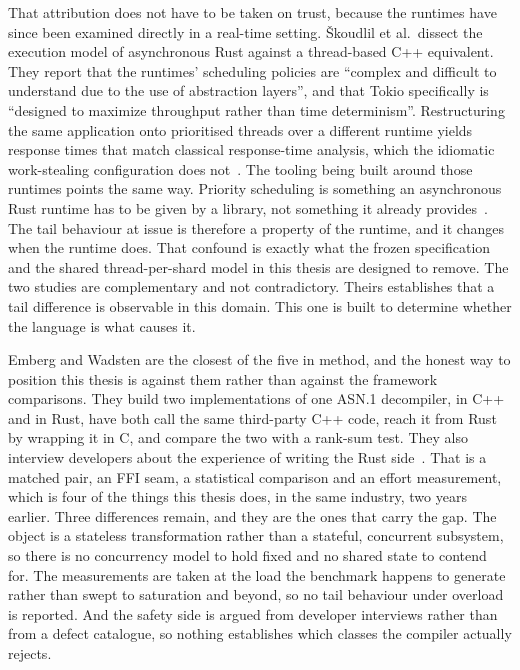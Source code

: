 \documentclass[english,oneside,a4paper,censored,csm,software-track-2020]{HYthesisML}
\begin{document}
That attribution does not have to be taken on trust, because the runtimes have since been
examined directly in a real-time setting. \v{S}koudlil et al.\ dissect the execution model of
asynchronous Rust against a thread-based C++ equivalent. They report that the
runtimes' scheduling policies are ``complex and difficult to understand due to the use of
abstraction layers'', and that Tokio specifically is ``designed to maximize throughput rather than
time determinism''. Restructuring the same application onto prioritised threads over a different
runtime yields response times that match classical response-time analysis, which the idiomatic
work-stealing configuration does not~\cite{skoudlil2025asyncrust}. The tooling being built around
those runtimes points the same way. Priority scheduling is something an asynchronous Rust runtime
has to be given by a library, not something it already
provides~\cite{zhuang2026flowprioritize}. The tail behaviour at issue is
therefore a property of the runtime, and it changes when the runtime does. That confound is
exactly what the frozen specification and the shared thread-per-shard model in this thesis are
designed to remove. The two studies are complementary and not contradictory.
Theirs establishes that a tail difference is observable in this domain. This one is
built to determine whether the language is what causes it.

Emberg and Wadsten are the closest of the five in method, and the honest way to position this
thesis is against them rather than against the framework comparisons. They build two
implementations of one ASN.1 decompiler, in C++ and in Rust, have both call the same third-party
C++ code, reach it from Rust by wrapping it in C, and compare the two with a rank-sum test. They
also interview developers about the experience of writing the Rust side~\cite{emberg2023asn1}.
That is a matched pair, an FFI seam, a statistical comparison and an effort measurement, which is
four of the things this thesis does, in the same industry, two years earlier. Three differences
remain, and they are the ones that carry the gap. The object is a stateless transformation rather
than a stateful, concurrent subsystem, so there is no concurrency model to hold fixed and no
shared state to contend for. The measurements are taken at the load the benchmark happens to
generate rather than swept to saturation and beyond, so no tail behaviour under overload is
reported. And the safety side is argued from developer interviews rather than from a defect
catalogue, so nothing establishes which classes the compiler actually rejects.
\end{document}

